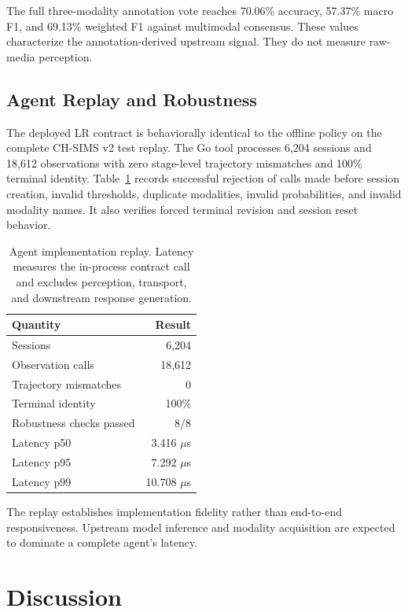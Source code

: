 \documentclass[journal]{IEEEtran}
\begin{document}


The full three-modality annotation vote reaches 70.06\% accuracy, 57.37\% macro F1, and 69.13\% weighted F1 against multimodal consensus. These values characterize the annotation-derived upstream signal. They do not measure raw-media perception.

\subsection{Agent Replay and Robustness}

The deployed LR contract is behaviorally identical to the offline policy on the complete CH-SIMS v2 test replay. The Go tool processes 6,204 sessions and 18,612 observations with zero stage-level trajectory mismatches and 100\% terminal identity. Table~\ref{tab:agent} records successful rejection of calls made before session creation, invalid thresholds, duplicate modalities, invalid probabilities, and invalid modality names. It also verifies forced terminal revision and session reset behavior.

\begin{table}[t]
\centering
\caption{Agent implementation replay. Latency measures the in-process contract call and excludes perception, transport, and downstream response generation.}
\label{tab:agent}
\begin{tabular}{lr}
\toprule
Quantity & Result \\
\midrule
Sessions & 6,204 \\
Observation calls & 18,612 \\
Trajectory mismatches & 0 \\
Terminal identity & 100\% \\
Robustness checks passed & 8/8 \\
Latency p50 & 3.416 $\mu$s \\
Latency p95 & 7.292 $\mu$s \\
Latency p99 & 10.708 $\mu$s \\
\bottomrule
\end{tabular}
\end{table}

The replay establishes implementation fidelity rather than end-to-end responsiveness. Upstream model inference and modality acquisition are expected to dominate a complete agent's latency.

\section{Discussion}
\end{document}

